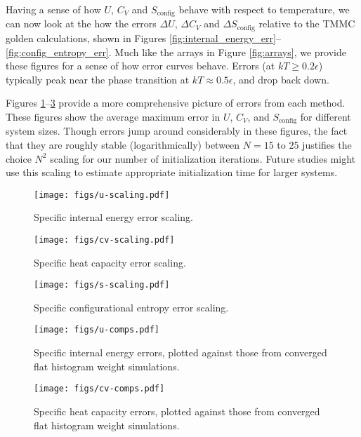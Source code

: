 \documentclass[11pt]{article}
\renewcommand{\t}{\text} %
\begin{document}
Having a sense of how $U$, $C_V$ and $S_{\t{config}}$ behave with
respect to temperature, we can now look at the how the errors $\Delta
U$, $\Delta C_V$ and $\Delta S_{\t{config}}$ relative to the TMMC
golden calculations, shown in Figures
\ref{fig:internal_energy_err}--\ref{fig:config_entropy_err}. Much like
the arrays in Figure \ref{fig:arrays}, we provide these figures for a
sense of how error curves behave. Errors (at $kT\ge0.2\epsilon$)
typically peak near the phase transition at $kT\approx0.5\epsilon$,
and drop back down.

Figures \ref{fig:u_scaling}--\ref{fig:s_scaling} provide a more
comprehensive picture of errors from each method. These figures show
the average maximum error in $U$, $C_V$, and $S_{\t{config}}$ for
different system sizes. Though errors jump around considerably in
these figures, the fact that they are roughly stable (logarithmically)
between $N=15$ to $25$ justifies the choice $N^2$ scaling for our
number of initialization iterations.  Future studies might use this
scaling to estimate appropriate initialization time for larger
systems.

\begin{figure}[p]
  \centering
  \texttt{[image: figs/u-scaling.pdf]}
  \caption[Internal energy error scaling]
  {Specific internal energy error scaling.}
  \label{fig:u_scaling}
\end{figure}

\begin{figure}[p]
  \centering
  \texttt{[image: figs/cv-scaling.pdf]}
  \caption[Heat capacity error scaling]
  {Specific heat capacity error scaling.}
  \label{fig:cv_scaling}
\end{figure}

\begin{figure}[p]
  \centering
  \texttt{[image: figs/s-scaling.pdf]}
  \caption[Configurational entropy error scaling]
  {Specific configurational entropy error scaling.}
  \label{fig:s_scaling}
\end{figure}


\begin{figure}[p]
  \centering
  \texttt{[image: figs/u-comps.pdf]}
  \caption[Internal energy error comparisons]
  {Specific internal energy errors, plotted against those from
    converged flat histogram weight simulations.}
  \label{fig:u_comps}
\end{figure}

\begin{figure}[p]
  \centering
  \texttt{[image: figs/cv-comps.pdf]}
  \caption[Heat capacity error comparisons]
  {Specific heat capacity errors, plotted against those from converged
    flat histogram weight simulations.}
  \label{fig:cv_comps}
\end{figure}
\end{document}
